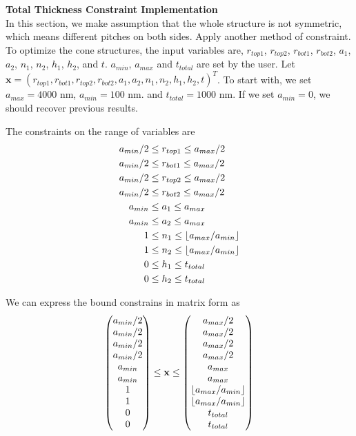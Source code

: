 \documentclass[12pt]{article}
\numberwithin{equation}{section}
\DeclarePairedDelimiter\floor{\lfloor}{\rfloor}
\numberwithin{equation}{section}
\begin{document}
\begin{outline}[enumerate]
\1 \textbf{Total Thickness Constraint Implementation}  \\
In this section, we make assumption that the whole structure is not symmetric, which means different pitches  on both sides.  Apply another method of constraint. To optimize the cone structures, the input variables are, $r_{top1}$, $r_{top2}$, $r_{bot1}$, $r_{bot2}$, $a_1$, $a_2$, $n_1$, $n_2$, $h_1$, $h_2$, and $t$. $a_{min}$, $a_{max}$ and $t_{total}$ are set by the user. Let $\mathbf{x} = \left ( r_{top1}, r_{bot1}, r_{top2}, r_{bot2}, a_1, a_2, n_1, n_2, h_1, h_2, t  \right )^T $. To start with, we set $a_{max} = 4000$ nm, $a_{min} = 100$ nm.  and $t_{total} = 1000$ nm. If we set $a_{min} = 0$, we should recover previous results.

The constraints on the range of variables are
\begin{align*}
a_{min}/2 & \leq r_{top1} \leq a_{max}/2 \\
a_{min}/2 & \leq r_{bot1} \leq a_{max}/2 \\
a_{min}/2 & \leq r_{top2} \leq a_{max}/2 \\
a_{min}/2 & \leq r_{bot2} \leq a_{max}/2 \\
a_{min} & \leq a_{1} \leq a_{max} \\
a_{min} & \leq a_{2} \leq a_{max} \\
1 & \leq n_1 \leq \floor{a_{max}/a_{min}} \\
1 & \leq n_2 \leq \floor{a_{max}/a_{min}} \\
0 & \leq h_1 \leq t_{total}\\ 
0 & \leq h_2 \leq  t_{total}
\end{align*}

We can express the bound constrains in matrix form as
\begin{equation}
\left(
\begin{matrix}
a_{min}/2\\ 
a_{min}/2\\ 
a_{min}/2\\ 
a_{min}/2\\
a_{min}\\ 
a_{min}\\ 
1 \\    %
1 \\
0 \\
0 
\end{matrix} \right )
\leq \mathbf{x}
 \leq 
 \left(
\begin{matrix}
a_{max}/2 \\ a_{max}/2 \\ a_{max}/2 \\ a_{max}/2 \\ a_{max} \\ a_{max} \\ \floor{a_{max}/a_{min}}  \\ \floor{a_{max}/a_{min}}  \\  t_{total} \\t_{total}
\end{matrix} \right )
\end{equation}


\end{outline}
\end{document}
